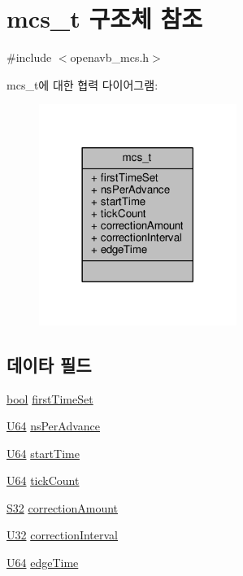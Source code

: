 \hypertarget{structmcs__t}{}\section{mcs\+\_\+t 구조체 참조}
\label{structmcs__t}


{\ttfamily \#include $<$openavb\+\_\+mcs.\+h$>$}



mcs\+\_\+t에 대한 협력 다이어그램\+:
\nopagebreak
\begin{figure}[H]
\begin{center}
\leavevmode
\includegraphics[width=182pt]{structmcs__t__coll__graph}
\end{center}
\end{figure}
\subsection*{데이타 필드}
\begin{DoxyCompactItemize}
\item 
\hyperlink{avb__gptp_8h_af6a258d8f3ee5206d682d799316314b1}{bool} \hyperlink{structmcs__t_a76542ec51304d98fa6a79901286a8a96}{first\+Time\+Set}
\item 
\hyperlink{openavb__types__base__pub_8h_a25809e0734a149248fcf5831efa4e33d}{U64} \hyperlink{structmcs__t_a8c7e6754a1057a5f8d55b32fcbf1ae59}{ns\+Per\+Advance}
\item 
\hyperlink{openavb__types__base__pub_8h_a25809e0734a149248fcf5831efa4e33d}{U64} \hyperlink{structmcs__t_ae1aea99ce2da5f78fb0e3e6467975541}{start\+Time}
\item 
\hyperlink{openavb__types__base__pub_8h_a25809e0734a149248fcf5831efa4e33d}{U64} \hyperlink{structmcs__t_aab3e4c044b10fe2ea489b3949aff1090}{tick\+Count}
\item 
\hyperlink{openavb__types__base__pub_8h_a39c786017723555afb9e8b85accec0de}{S32} \hyperlink{structmcs__t_a409bc76adf1e5c9d63d0ad888b3def8f}{correction\+Amount}
\item 
\hyperlink{openavb__types__base__pub_8h_a696390429f2f3b644bde8d0322a24124}{U32} \hyperlink{structmcs__t_a477f1f85f2290ef7914f73b6a8d93632}{correction\+Interval}
\item 
\hyperlink{openavb__types__base__pub_8h_a25809e0734a149248fcf5831efa4e33d}{U64} \hyperlink{structmcs__t_a99b06b68590b7637eacd45776c7fc77b}{edge\+Time}
\end{DoxyCompactItemize}


